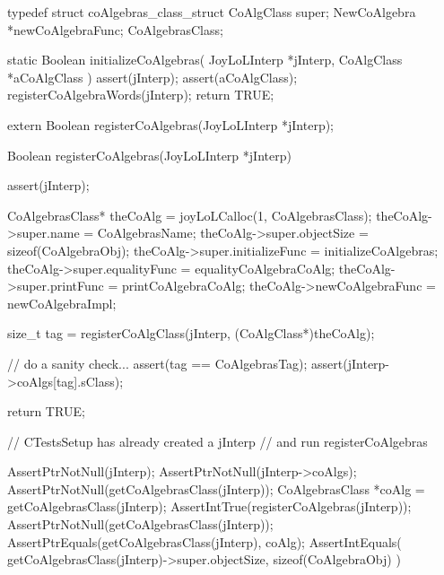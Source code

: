 \startTestSuite[registerCoAlgebras]

\startCHeader
typedef struct coAlgebras_class_struct {
  CoAlgClass    super;
  NewCoAlgebra *newCoAlgebraFunc;
} CoAlgebrasClass;
\stopCHeader

\startCCode
static Boolean initializeCoAlgebras(
  JoyLoLInterp *jInterp,
  CoAlgClass   *aCoAlgClass
) {
  assert(jInterp);
  assert(aCoAlgClass);
  registerCoAlgebraWords(jInterp);
  return TRUE;
}
\stopCCode

\startCHeader
extern Boolean registerCoAlgebras(JoyLoLInterp *jInterp);
\stopCHeader
{}

\startCCode
Boolean registerCoAlgebras(JoyLoLInterp *jInterp) {
  assert(jInterp);
  
  CoAlgebrasClass* theCoAlg    =
    joyLoLCalloc(1, CoAlgebrasClass);
  theCoAlg->super.name           = CoAlgebrasName;
  theCoAlg->super.objectSize     = sizeof(CoAlgebraObj);
  theCoAlg->super.initializeFunc = initializeCoAlgebras;
  theCoAlg->super.equalityFunc   = equalityCoAlgebraCoAlg;
  theCoAlg->super.printFunc      = printCoAlgebraCoAlg;
  theCoAlg->newCoAlgebraFunc     = newCoAlgebraImpl;
  
  size_t tag =
    registerCoAlgClass(jInterp, (CoAlgClass*)theCoAlg);

  // do a sanity check...
  assert(tag == CoAlgebrasTag);
  assert(jInterp->coAlgs[tag].sClass);

  return TRUE;
}
\stopCCode


\startCTest
  // CTestsSetup has already created a jInterp
  // and run registerCoAlgebras
  
  AssertPtrNotNull(jInterp);
  AssertPtrNotNull(jInterp->coAlgs);
  AssertPtrNotNull(getCoAlgebrasClass(jInterp));
  CoAlgebrasClass *coAlg =
    getCoAlgebrasClass(jInterp);
  AssertIntTrue(registerCoAlgebras(jInterp));
  AssertPtrNotNull(getCoAlgebrasClass(jInterp));
  AssertPtrEquals(getCoAlgebrasClass(jInterp), coAlg);
  AssertIntEquals(
    getCoAlgebrasClass(jInterp)->super.objectSize,
    sizeof(CoAlgebraObj)
  )
\stopCTest
\stopTestCase
\stopTestSuite
